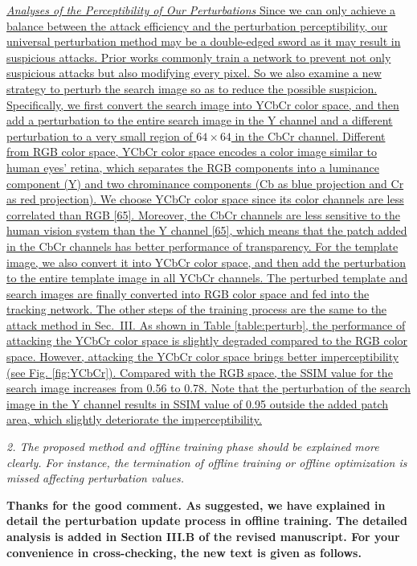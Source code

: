 \documentclass[12pt]{article}
\begin{document}
\uline{\textit{Analyses of the Perceptibility of Our Perturbations}
Since we can only achieve a balance between the attack efficiency and the perturbation perceptibility, our universal perturbation method may be a double-edged sword as it may result in suspicious attacks. Prior works commonly train a network to prevent not only suspicious attacks but also modifying every pixel. So we also examine a new strategy to perturb the search image so as to reduce the possible suspicion. Specifically, we first convert the search image into YCbCr color space, and then add a perturbation to the entire search image in the Y channel and a different perturbation to a very small region of $64 \times 64$ in the CbCr channel. Different from RGB color space, YCbCr color space encodes a color image similar to human eyes’ retina, which separates the RGB components into a luminance component (Y) and two chrominance components (Cb as blue projection and Cr as red projection). We choose YCbCr color space since its color channels are less correlated than RGB [65]. Moreover, the CbCr channels are less sensitive to the human vision system than the Y channel [65], which means that the patch added in the CbCr channels has better performance of transparency.
For the template image, we also convert it into YCbCr color space, and then add the perturbation to the entire template image in all YCbCr channels. The perturbed template and search images are finally converted into RGB color space and fed into the tracking network. The other steps of the training process are the same to the attack method in Sec.~III. As shown in Table \ref{table:perturb}, the performance of attacking the YCbCr color space is slightly degraded compared to the RGB color space. However, attacking the YCbCr color space brings better imperceptibility (see Fig. \ref{fig:YCbCr}). Compared with the RGB space, the SSIM value for the search image increases from 0.56 to 0.78. Note that the perturbation of the search image in the Y channel results in SSIM value of 0.95 outside the added patch area, which slightly deteriorate the imperceptibility.
}

\textit{2. The proposed method and offline training phase should be explained more clearly. For instance, the termination of offline training or offline optimization is missed affecting perturbation values.}

\textbf{Thanks for the good comment. As suggested, we have explained in detail the perturbation update process in offline training.
The detailed analysis is added in Section III.B of the revised manuscript.
For your convenience in cross-checking, the new text is given as follows.}
\end{document}
